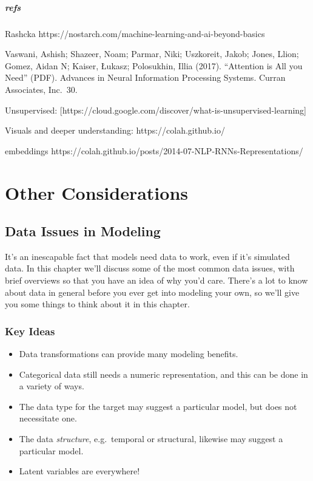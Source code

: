\documentclass[
  letterpaper,
]{krantz}
\providecommand{\tightlist}{%
  \setlength{\itemsep}{0pt}\setlength{\parskip}{0pt}}\usepackage{longtable,booktabs,array}
\begin{document}
\subsubsection{refs}\label{refs-2}

Rashcka https://nostarch.com/machine-learning-and-ai-beyond-basics

Vaswani, Ashish; Shazeer, Noam; Parmar, Niki; Uszkoreit, Jakob; Jones,
Llion; Gomez, Aidan N; Kaiser, Łukasz; Polosukhin, Illia (2017).
``Attention is All you Need'' (PDF). Advances in Neural Information
Processing Systems. Curran Associates, Inc.~30.

Unsupervised:
{[}https://cloud.google.com/discover/what-is-unsupervised-learning{]}

Visuals and deeper understanding: https://colah.github.io/

embeddings
https://colah.github.io/posts/2014-07-NLP-RNNs-Representations/

\part{Other Considerations}

\chapter{Data Issues in Modeling}\label{sec-data}

It's an inescapable fact that models need data to work, even if it's
simulated data. In this chapter we'll discuss some of the most common
data issues, with brief overviews so that you have an idea of why you'd
care. There's a lot to know about data in general before you ever get
into modeling your own, so we'll give you some things to think about it
in this chapter.

\section{Key Ideas}\label{key-ideas-3}

\begin{itemize}
\tightlist
\item
  Data transformations can provide many modeling benefits.
\item
  Categorical data still needs a numeric representation, and this can be
  done in a variety of ways.
\item
  The data type for the target may suggest a particular model, but does
  not necessitate one.
\item
  The data \emph{structure}, e.g.~temporal or structural, likewise may
  suggest a particular model.
\item
  Latent variables are everywhere!
\end{itemize}
\end{document}
